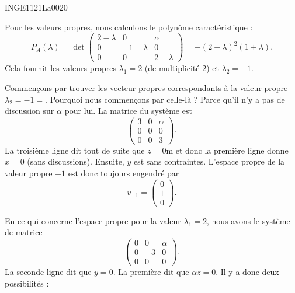 

\begin{corrige}{INGE1121La0020}

	Pour les valeurs propres, nous calculons le polynôme caractéristique :
	\begin{equation}
		P_A(\lambda)=\det\begin{pmatrix}
			2-\lambda	&	0	&	\alpha	\\
			0	&	-1-\lambda	&	0	\\
			0	&	0	&	2-\lambda
		\end{pmatrix}
		=
		-(2-\lambda)^2(1+\lambda).
	\end{equation}
	Cela fournit les valeurs propres $\lambda_1=2$ (de multiplicité $2$) et $\lambda_2=-1$.

	Commençons par trouver les vecteur propres correspondants à la valeur propre $\lambda_2=-1=$. Pourquoi nous commençons par celle-là ? Parce qu'il n'y a pas de discussion sur $\alpha$ pour lui. La matrice du système est
	\begin{equation}
		\begin{pmatrix}
			3	&	0	&	\alpha	\\
			0	&	0	&	0	\\
			0	&	0	&	3
		\end{pmatrix}.
	\end{equation}
	La troisième ligne dit tout de suite que $z=0$m et donc la première ligne donne $x=0$ (sans discussions). Ensuite, $y$ est sans contraintes. L'espace propre de la valeur propre $-1$ est donc toujours engendré par
	\begin{equation}
		v_{-1}=\begin{pmatrix}
			0	\\ 
			1	\\ 
			0	
		\end{pmatrix}.
	\end{equation}

	En ce qui concerne l'espace propre pour la valeur $\lambda_1=2$, nous avons le système de matrice
	\begin{equation}
		\begin{pmatrix}
			0	&	0	&	\alpha	\\
			0	&	-3	&	0	\\
			0	&	0	&	0
		\end{pmatrix}.
	\end{equation}
	La seconde ligne dit que $y=0$. La première dit que $\alpha z=0$. Il y a donc deux possibilités :
	\begin{enumerate}


\end{enumerate}
\end{corrige}
